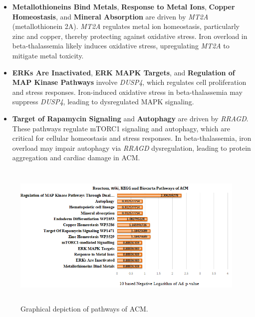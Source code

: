 \begin{itemize}
    \item \textbf{Metallothioneins Bind Metals}, \textbf{Response to Metal Ions}, \textbf{Copper Homeostasis}, and \textbf{Mineral Absorption} are driven by \textit{MT2A} (metallothionein 2A). \textit{MT2A} regulates metal ion homeostasis, particularly zinc and copper, thereby protecting against oxidative stress. Iron overload in beta-thalassemia likely induces oxidative stress, upregulating \textit{MT2A} to mitigate metal toxicity.

    \item \textbf{ERKs Are Inactivated}, \textbf{ERK MAPK Targets}, and \textbf{Regulation of MAP Kinase Pathways} involve \textit{DUSP4}, which regulates cell proliferation and stress responses. Iron-induced oxidative stress in beta-thalassemia may suppress \textit{DUSP4}, leading to dysregulated MAPK signaling.

    \item \textbf{Target of Rapamycin Signaling} and \textbf{Autophagy} are driven by \textit{RRAGD}. These pathways regulate mTORC1 signaling and autophagy, which are critical for cellular homeostasis and stress responses. In beta-thalassemia, iron overload may impair autophagy via \textit{RRAGD} dysregulation, leading to protein aggregation and cardiac damage in ACM.
\end{itemize}

\begin{figure}[H]
\centering
\includegraphics[height=7cm]{./fig/fig4_8.png} 
\centering
\caption{Graphical depiction of   pathways of ACM.}
\label{Graphical depiction of   pathways of ACM.}
\end{figure}

